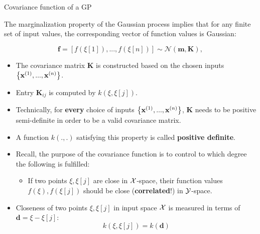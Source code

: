 









\begin{vbframe}{Covariance function of a GP}

  The marginalization property of the Gaussian process implies that for any finite set of input values, the corresponding vector of function values is Gaussian:

  $$
    \bm{f} = \left[f\left(\xi[1]\right), ..., f\left(\xi[n]\right)\right] \sim \mathcal{N}\left(\bm{m}, \bm{K}\right),
  $$ 


\begin{itemize}
  \item The covariance matrix $\bm{K}$ is constructed based on the chosen inputs $\left\{\mathbf{x}^{(1)}, ..., \mathbf{x}^{(n)}\right\}$.
  \item Entry $\bm{K}_{ij}$ is computed by $k\left(\xi, \xi[j]\right)$.
  \item Technically, for \textbf{every} choice of inputs $\left\{\mathbf{x}^{(1)}, ..., \mathbf{x}^{(n)}\right\}$, $\bm{K}$ needs to be positive semi-definite in order to be a valid covariance matrix.
  \item A function $k(.,.)$ satisfying this property is called \textbf{positive definite}.

\framebreak 

  \item Recall, the purpose of the covariance function is to control to which degree the following is fulfilled: \vspace*{0.4cm}
  \begin{itemize}
    \item[] If two points $\xi, \xi[j]$ are close in $\mathcal{X}$-space, their function values $f(\xi), f(\xi[j])$ should be close (\textbf{correlated}!) in $\mathcal{Y}$-space.
  \end{itemize} \vspace*{0.4cm}

  \item Closeness of two points $\xi, \xi[j]$ in input space $\mathcal{X}$ is measured in terms of $\bm{d} = \xi - \xi[j]$: 
  $$
    k(\xi, \xi[j]) = k(\bm{d})
  $$ 
\end{itemize}


\end{vbframe}

